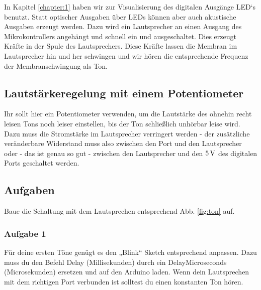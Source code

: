In Kapitel \ref{chapter:1} haben wir zur Visualisierung des digitalen Ausgänge LED`s benutzt.
Statt optischer Ausgaben über LEDs können aber auch akustische Ausgaben erzeugt werden. 
Dazu wird ein Lautsprecher an einen Ausgang des Mikrokontrollers angehängt und schnell ein und 
ausgeschaltet. Dies erzeugt Kräfte in der Spule des Lautsprechers. Diese Kräfte lassen die Membran
im Lautsprecher hin und her schwingen und wir hören die entsprechende Frequenz der 
Membranschwingung als Ton.

\subsection{Lautstärkeregelung mit einem Potentiometer}

Ihr sollt hier ein Potentiometer verwenden, um die Lautstärke des ohnehin recht leisen Tons noch leiser einstellen, bis der Ton schließlich unhörbar leise wird. Dazu muss die Stromstärke im Lautsprecher verringert werden - der zusätzliche veränderbare Widerstand muss also zwischen den Port und den Lautsprecher oder - das ist genau so gut - zwischen den Lautsprecher und den $5\operatorname{V}$ des digitalen Ports geschaltet werden. 


\subsection{Aufgaben}

Baue die Schaltung mit dem Lautsprechen entsprechend Abb. \ref{fig:ton} auf. 

\subsubsection{Aufgabe 1}
Für deine ersten Töne genügt es den „Blink“ Sketch entsprechend anpassen. Dazu muss du den Befehl Delay (Millisekunden) durch ein DelayMicroseconds (Microsekunden) ersetzen und auf den Arduino laden. Wenn dein Lautsprechen mit dem richtigen Port verbunden ist solltest du einen konstanten Ton hören.



